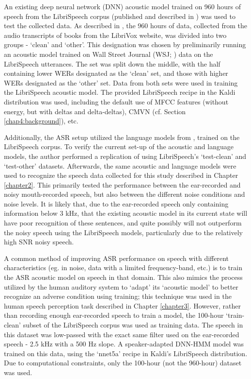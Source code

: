 An existing deep neural network (DNN) acoustic model trained on 960 hours of speech from the LibriSpeech corpus (published and described in \cite{panayotov:15}) was used to test the collected data.  As described in \cite{panayotov:15}, the 960 hours of data, collected from the audio transcripts of books from the LibriVox website, was divided into two groups - `clean' and `other'.  This designation was chosen by preliminarily running an acoustic model trained on Wall Street Journal (WSJ; \cite{paul:92}) data on the LibriSpeech utterances. The set was split down the middle, with the half containing lower WERs designated as the `clean' set, and those with higher WERs designated as the `other' set.  Data from both sets were used in training the LibriSpeech acoustic model.  The provided LibriSpeech recipe in the Kaldi distribution was used, including the default use of MFCC features (without energy, but with deltas and delta-deltas), CMVN (cf. Section \ref{chap4:background}), etc.

Additionally, the ASR setup utilized the language models from \cite{panayotov:15}, trained on the LibriSpeech corpus.  To verify the current set-up of the acoustic and language models, the author performed a replication of \cite{panayotov:15} using LibriSpeech's `test-clean' and `test-other' datasets.  Afterwards, the same acoustic and language models were used to recognize the speech data collected for this study described in Chapter \ref{chapter2}. This primarily tested the performance between the ear-recorded and noisy mouth-recorded speech, but also between the different noise conditions and noise levels.  
It is likely that, due to the ear-recorded speech only containing information below 3 kHz, that the existing acoustic model in its current state will have poor recognition of these sentences, and quite possibly will not outperform the noisy speech using the LibriSpeech models, particularly due to the relatively high SNR noisy speech.

A common method of improving ASR performance on speech with different characteristics (eg. in noise, data with a limited frequency-band, etc.) is to train the ASR acoustic model on speech in that domain.  This also mimics the process utilized by the human auditory system to `adapt' its `acoustic model' to better recognize an adverse condition using training; this technique was used in the human speech perception task described in Chapter \ref{chapter3}.  However, rather than recording enough ear-recorded speech to train a model, the 100-hour `train-clean' subset of the LibriSpeech corpus was used as training data.  The speech in this dataset was low-passed with the exact same filter used on the ear-recorded speech - 2.5 kHz with a 500 Hz slope.  A speaker-adapted DNN-HMM model was trained on this data, using the `nnet5a' recipe in Kaldi's LibriSpeech distribution.  Due to computational constraints, only the 100-hour (not the 960-hour) dataset was used.

